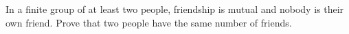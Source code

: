 In a finite group of at least two people, friendship is mutual and nobody is their own friend. Prove that two people have the same number of friends.
